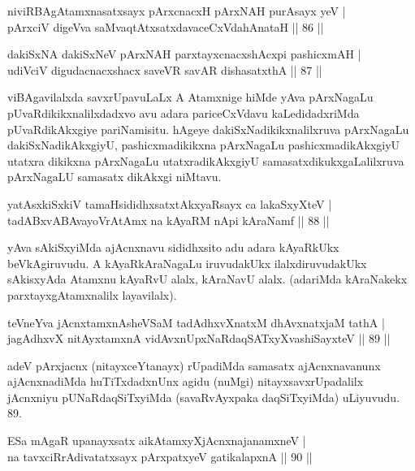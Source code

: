 \begin{shl}
niviRBAgAtamxnasatxsayx pArxcnacxH pArxNAH purA\s sayx yeV |\\
pArxciV digeVva saMvaqtAtxsatxdavaceCxVdahAnataH \hfill || 86 || 
\end{shl}

\begin{shl}
dakiSxNA dakiSxNeV pArxNAH parxtayxcnacxshAcxpi pashicxmAH |\\
udiVciV digudacnacxshacx saveVR savAR dishasatxthA \hfill || 87 || 
\end{shl}

\begin{artha}
viBAgavilalxda savxrUpavuLaLx A Atamxnige hiMde yAva pArxNagaLu pUvaRdikikxnalilxdadxvo avu adara pariceCxVdavu kaLedidadxriMda pUvaRdikAkxgiye pariNamisitu. hAgeye dakiSxNadikikxnalilxruva pArxNagaLu dakiSxNadikAkxgiyU, pashicxmadikikxna pArxNagaLu pashicxmadikAkxgiyU utatxra dikikxna pArxNagaLu utatxradikAkxgiyU samasatxdikukxgaLalilxruva pArxNagaLU samasatx dikAkxgi niMtavu.
\end{artha}

\begin{shl}
yatAsxkiSxkiV tamaHsididhxsatxtAkxyaRsayx ca lakaSxyXteV |\\
tadABxvABAvayoVrAtAmx na kAyaRM nApi kAraNamf \hfill || 88 || 
\end{shl}

\begin{artha}
yAva sAkiSxyiMda ajAcnxnavu sididhxsito adu adara kAyaRkUkx beVkAgiruvudu. A kAyaRkAraNagaLu iruvudakUkx ilalxdiruvudakUkx sAkisxyAda Atamxnu kAyaRvU alalx, kAraNavU alalx. (adariMda kAraNakekx parxtayxgAtamxnalilx layavilalx). 
\end{artha}

\begin{shl}
teVneYva jAcnxtamxnA\s sheVSaM tadAdhxvXnatxM dhAvxnatxjaM tathA |\\
jagAdhxvX nitAyxtamxnA vidAvxnUpxNaRdaqSATxyX\s vashiSayxteV \hfill || 89 || 
\end{shl}

\begin{artha}
adeV pArxjacnx (nitayxceYtanayx) rUpadiMda samasatx ajAcnxnavanunx ajAcnxnadiMda huTiTxdadxnUnx agidu (nuMgi) nitayxsavxrUpadalilx jAcnxniyu pUNaRdaqSiTxyiMda (savaRvAyxpaka daqSiTxyiMda) uLiyuvudu. 89.
\end{artha}


\begin{shl}
ESa mAgaR upanayxsatx aikAtamxyXjAcnxnajanamxneV |\\
na tavxciRrAdivatatxsayx pArxpatxyeV gatikalapxnA \hfill || 90 || 
\end{shl}

